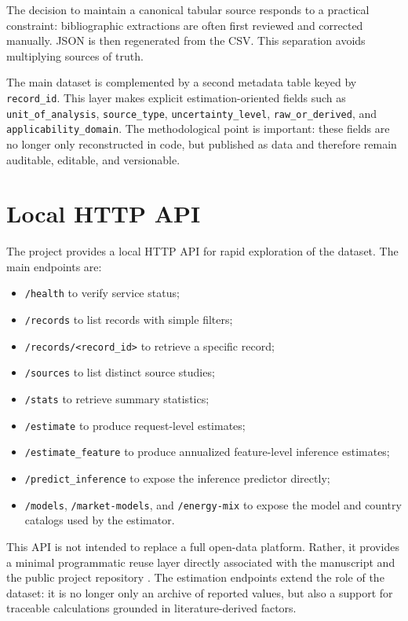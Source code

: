\documentclass[11pt,a4paper]{article}
\begin{document}
The decision to maintain a canonical tabular source responds to a practical constraint: bibliographic extractions are often first reviewed and corrected manually. JSON is then regenerated from the CSV. This separation avoids multiplying sources of truth.

The main dataset is complemented by a second metadata table keyed by \texttt{record\_id}. This layer makes explicit estimation-oriented fields such as \texttt{unit\_of\_analysis}, \texttt{source\_type}, \texttt{uncertainty\_level}, \texttt{raw\_or\_derived}, and \texttt{applicability\_domain}. The methodological point is important: these fields are no longer only reconstructed in code, but published as data and therefore remain auditable, editable, and versionable.

\section{Local HTTP API}
The project provides a local HTTP API for rapid exploration of the dataset. The main endpoints are:
\begin{itemize}
\item \texttt{/health} to verify service status;
\item \texttt{/records} to list records with simple filters;
\item \texttt{/records/<record\_id>} to retrieve a specific record;
\item \texttt{/sources} to list distinct source studies;
\item \texttt{/stats} to retrieve summary statistics;
\item \texttt{/estimate} to produce request-level estimates;
\item \texttt{/estimate\_feature} to produce annualized feature-level inference estimates;
\item \texttt{/predict\_inference} to expose the inference predictor directly;
\item \texttt{/models}, \texttt{/market-models}, and \texttt{/energy-mix} to expose the model and country catalogs used by the estimator.
\end{itemize}

This API is not intended to replace a full open-data platform. Rather, it provides a minimal programmatic reuse layer directly associated with the manuscript and the public project repository \cite{impactllmrepo2026}. The estimation endpoints extend the role of the dataset: it is no longer only an archive of reported values, but also a support for traceable calculations grounded in literature-derived factors.
\end{document}
